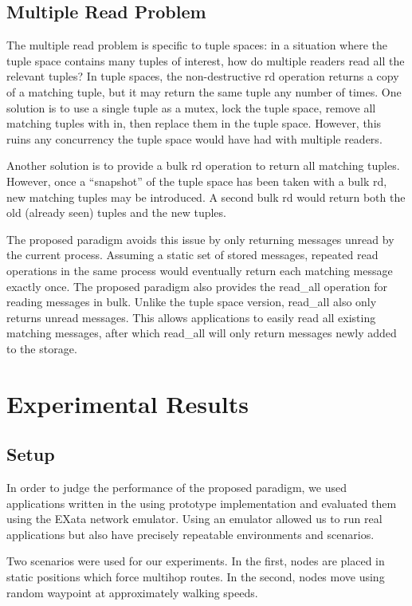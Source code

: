 \documentclass[lnicst]{svmultln}
\begin{document}
\subsection{Multiple Read Problem}

The multiple read problem \cite{mrdp} is specific to tuple spaces: in a situation where the tuple space contains many tuples of interest, how do multiple readers read all the relevant tuples? In tuple spaces, the non-destructive rd operation returns a copy of a matching tuple, but it may return the same tuple any number of times. One solution is to use a single tuple as a mutex, lock the tuple space, remove all matching tuples with in, then replace them in the tuple space. However, this ruins any concurrency the tuple space would have had with multiple readers.

Another solution is to provide a bulk rd operation to return all matching tuples. However, once a “snapshot” of the tuple space has been taken with a bulk rd, new matching tuples may be introduced. A second bulk rd would return both the old (already seen) tuples and the new tuples.

The proposed paradigm avoids this issue by only returning messages unread by the current process. Assuming a static set of stored messages, repeated read operations in the same process would eventually return each matching message exactly once. The proposed paradigm also provides the read\_all operation for reading messages in bulk. Unlike the tuple space version, read\_all also only returns unread messages. This allows applications to easily read all existing matching messages, after which read\_all will only return messages newly added to the storage.

\section{Experimental Results}

\subsection{Setup}

In order to judge the performance of the proposed paradigm, we used applications written in the using prototype implementation and evaluated them using the EXata network emulator. Using an emulator allowed us to run real applications but also have precisely repeatable environments and scenarios.

Two scenarios were used for our experiments. In the first, nodes are placed in static positions which force multihop routes. In the second, nodes move using random waypoint at approximately walking speeds.
\end{document}
